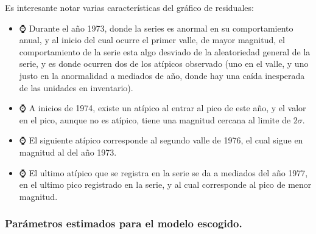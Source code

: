 \documentclass[]{article}
\providecommand{\tightlist}{%
  \setlength{\itemsep}{0pt}\setlength{\parskip}{0pt}}
\begin{document}
Es interesante notar varias características del gráfico de residuales:

\begin{itemize}
\tightlist
\item
  ⌚ Durante el año 1973, donde la series es anormal en su comportamiento anual, y al inicio del cual ocurre el primer valle, de mayor magnitud, el comportamiento de la serie esta algo desviado de la aleatoriedad general de la serie, y es donde ocurren dos de los atípicos observado (uno en el valle, y uno justo en la anormalidad a mediados de año, donde hay una caída inesperada de las unidades en inventario).
\item
  ⌚ A inicios de 1974, existe un atípico al entrar al pico de este año, y el valor en el pico, aunque no es atípico, tiene una magnitud cercana al limite de \(2\sigma\).
\item
  ⌚ El siguiente atípico corresponde al segundo valle de 1976, el cual sigue en magnitud al del año 1973.
\item
  ⌚ El ultimo atípico que se registra en la serie se da a mediados del año 1977, en el ultimo pico registrado en la serie, y al cual corresponde al pico de menor magnitud.
\end{itemize}

\hypertarget{paruxe1metros-estimados-para-el-modelo-escogido.}{%
\subsubsection{Parámetros estimados para el modelo escogido.}\label{paruxe1metros-estimados-para-el-modelo-escogido.}}
\end{document}
